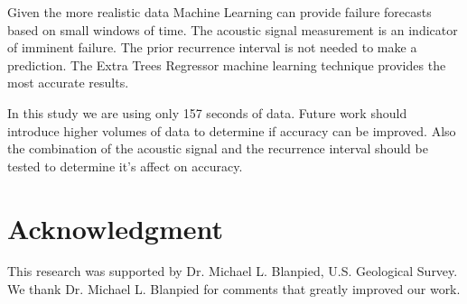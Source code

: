 \documentclass[]{llncs} %
\begin{document}
Given the more realistic data Machine Learning can provide failure forecasts based on small windows of time. The acoustic signal measurement is an indicator of imminent failure. The prior recurrence interval is not needed to make a prediction. The Extra Trees Regressor machine learning technique provides the most accurate results.



%
In this study we are using only 157 seconds of data. Future work should introduce higher volumes of data to determine if accuracy can be improved. Also the combination of the acoustic signal and the recurrence interval should be tested to determine it's affect on accuracy.
\par

\section{Acknowledgment}
This research was supported by Dr. Michael L. Blanpied,  U.S. Geological Survey. We thank Dr. Michael L. Blanpied for comments that greatly improved our work.



\end{document}
